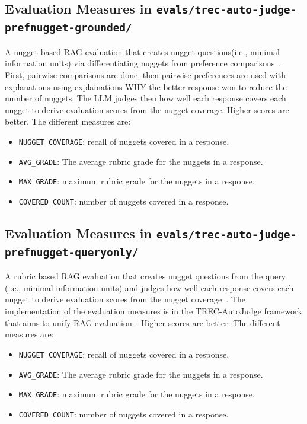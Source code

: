 \documentclass[]{ceurart}
\begin{document}
\subsection{Evaluation Measures in \texttt{evals/trec-auto-judge-prefnugget-grounded/}}

A nugget based RAG evaluation that creates nugget questions(i.e., minimal information units) via differentiating nuggets from preference comparisons~\cite{dietz:2026}. First, pairwise comparisons are done, then pairwise preferences are used with explanations using explainations WHY the better response won to reduce the number of nuggets. The LLM judges then how well each response covers each nugget to derive evaluation scores from the nugget coverage. Higher scores are better. The different measures are:

\begin{itemize}
\item
\texttt{NUGGET\_COVERAGE}: recall of nuggets covered in a response.
\item
\texttt{AVG\_GRADE}: The average rubric grade for the nuggets in a response.
\item
\texttt{MAX\_GRADE}: maximum rubric grade for the nuggets in a response.
\item
\texttt{COVERED\_COUNT}: number of nuggets covered in a response.
\end{itemize}


\subsection{Evaluation Measures in \texttt{evals/trec-auto-judge-prefnugget-queryonly/}}

A rubric based RAG evaluation that creates nugget questions from the query (i.e., minimal information units) and judges how well each response covers each nugget to derive evaluation scores from the nugget coverage~\cite{dietz:2026}. The implementation of the evaluation measures is in the TREC-AutoJudge framework that aims to unify RAG evaluation~\cite{farzi:2026}. Higher scores are better. The different measures are:

\begin{itemize}
\item
\texttt{NUGGET\_COVERAGE}: recall of nuggets covered in a response.
\item
\texttt{AVG\_GRADE}: The average rubric grade for the nuggets in a response.
\item
\texttt{MAX\_GRADE}: maximum rubric grade for the nuggets in a response.
\item
\texttt{COVERED\_COUNT}: number of nuggets covered in a response.
\end{itemize}


\end{document}
